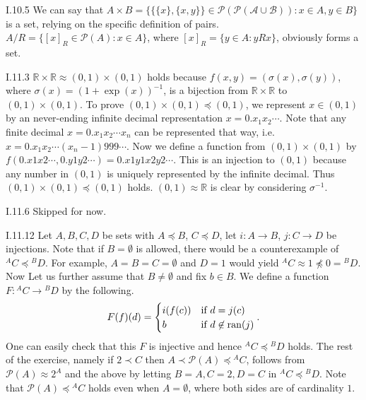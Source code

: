 \documentclass[12pt]{article}
\begin{document}
\begin{customthm}{I.10.5}
  We can say that $A\times B=\{\{\{x\},\{x,y\}\}\in\mathcal{P(\mathcal{P(A\cup B)})}:x\in A,y\in B\}$ is a set, relying on the specific definition of pairs. $A/R=\{[x]_R\in\mathcal{P}(A):x\in A\}$, where $[x]_R=\{y\in A:yRx\}$, obviously forms a set.
\end{customthm}

\begin{customthm}{I.11.3}
  $\mathbb{R}\times\mathbb{R}\approx(0,1)\times(0,1)$ holds because $f(x,y)=(\sigma(x),\sigma(y))$, where $\sigma(x)=(1+\exp(x))^{-1}$, is a bijection from $\mathbb{R}\times\mathbb{R}$ to $(0,1)\times(0,1)$. To prove $(0,1)\times(0,1)\preccurlyeq(0,1)$, we represent $x\in(0,1)$ by an never-ending infinite decimal representation $x=0.x_1x_2\cdots$. Note that any finite decimal $x=0.x_1x_2\cdots x_n$ can be represented that way, i.e. $x=0.x_1x_2\cdots(x_n-1)999\cdots$. Now we define a function from $(0,1)\times(0,1)$ by $f(0.x1x2\cdots, 0.y1y2\cdots) = 0.x1y1x2y2\cdots$. This is an injection to $(0,1)$ because any number in $(0,1)$ is uniquely represented by the infinite decimal. Thus $(0,1)\times(0,1)\preccurlyeq(0,1)$ holds. $(0,1)\approx\mathbb{R}$ is clear by considering $\sigma^{-1}$.
\end{customthm}

\begin{customthm}{I.11.6}
  Skipped for now.
\end{customthm}

\begin{customthm}{I.11.12}
  Let $A,B,C,D$ be sets with $A\preccurlyeq B$, $C\preccurlyeq D$, let $i:A\rightarrow B$, $j:C\rightarrow D$ be injections. Note that if $B=\emptyset$ is allowed, there would be a counterexample of ${}^AC\preccurlyeq{}^BD$. For example, $A=B=C=\emptyset$ and $D=1$ would yield ${}^AC\approx 1\not\preccurlyeq 0={}^BD$. Now Let us further assume that $B\neq\emptyset$ and fix $b\in B$. We define a function $F:{}^AC\rightarrow{}^BD$ by the following.
  \[F(f)(d)=
    \begin{cases}
      i(f(c)) & \text{if } d=j(c) \\
      b & \text{if } d\not\in\mathop{\mathrm{ran}}(j)
    \end{cases}.
  \]
  One can easily check that this $F$ is injective and hence ${}^AC\preccurlyeq{}^BD$ holds. The rest of the exercise, namely if $2\prec C$ then $A\prec \mathcal{P}(A)\preccurlyeq{}^AC$, follows from $\mathcal{P}(A)\approx 2^A$ and the above by letting $B=A, C=2, D=C$ in ${}^AC\preccurlyeq{}^BD$. Note that $\mathcal{P}(A)\preccurlyeq{}^AC$ holds even when $A=\emptyset$, where both sides are of cardinality $1$.
\end{customthm}
\end{document}
